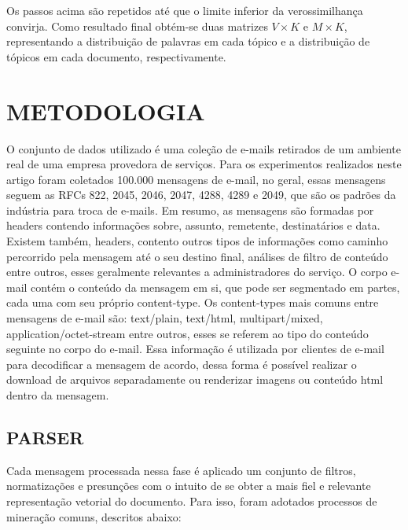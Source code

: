 \documentclass[12pt,a4paper]{article}
\begin{document}
Os passos acima são repetidos até que o limite inferior da verossimilhança convirja. Como resultado final obtém-se duas matrizes $V \times K$ e $M \times K$, representando  a distribuição de palavras em cada tópico e a distribuição de tópicos em cada documento, respectivamente.



\section{METODOLOGIA}
O conjunto de dados utilizado é uma coleção de e-mails retirados de um ambiente real de uma empresa provedora de serviços. Para os experimentos realizados neste artigo foram coletados 100.000 mensagens de e-mail, no geral, essas mensagens seguem as RFCs 822, 2045, 2046, 2047, 4288, 4289 e 2049, que são os padrões da indústria para troca de e-mails.
	Em resumo, as mensagens são formadas por headers contendo informações sobre, assunto, remetente, destinatários e data. Existem também, headers, contento outros tipos de informações como caminho percorrido pela mensagem até o seu destino final, análises de filtro de conteúdo entre outros, esses geralmente relevantes a administradores do serviço. O corpo e-mail contém o conteúdo da mensagem em si, que pode ser segmentado em  partes, cada uma com seu próprio content-type. Os content-types mais comuns entre mensagens de e-mail são: text/plain, text/html, multipart/mixed, application/octet-stream entre outros, esses se referem ao tipo do conteúdo seguinte no corpo do e-mail. Essa informação é utilizada por clientes de e-mail para decodificar a mensagem de acordo, dessa forma é possível realizar o download de arquivos separadamente ou renderizar imagens ou conteúdo html dentro da mensagem.


\subsection{PARSER}
Cada mensagem processada nessa fase é aplicado um conjunto de filtros, normatizações e presunções com o intuito de se obter a mais fiel e relevante representação vetorial do documento. Para isso, foram adotados processos de mineração comuns, descritos abaixo:
\end{document}
